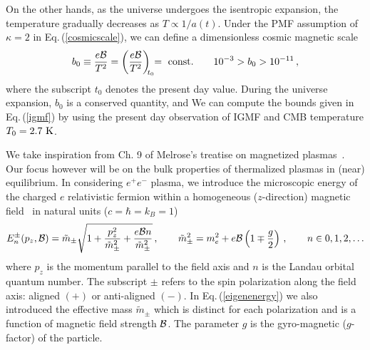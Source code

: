 \documentclass[a4paper]{article}
\newcommand{\req}[1]{Eq.\,(\ref{#1})}
\begin{document}


{\color{blue}On the other hands, as the universe undergoes the isentropic expansion,  the temperature gradually decreases as $T\propto1/a(t)$. Under the PMF assumption of $\kappa=2$ in \req{cosmicscale}, we can define a {\color{blue}dimensionless} cosmic magnetic scale
\begin{align}\label{magneticscale}
b_{0}\equiv\frac{e{\cal B}}{T^{2}}=\left(\frac{e{\cal B}}{T^{2}}\right)_{\!\!t_0}\!\!={\rm\ const.}\qquad10^{-3}>b_{0}>10^{-11}\,,
\end{align}
where the subscript $t_0$ denotes the present day value. During the universe expansion, $b_0$ is a conserved quantity, and We can compute the bounds given in \req{igmf} by using the present day observation of IGMF and CMB temperature $T_{0}=2.7{\rm\ K}$.}

We take inspiration from Ch. 9 of Melrose's treatise on magnetized plasmas~\cite{melrose2008quantum}. Our focus however will be on the bulk properties of thermalized plasmas in (near) equilibrium. In considering $e^{+}e^{-}$ plasma, we introduce the microscopic energy of the charged $e$ relativistic fermion within a homogeneous ($z$-direction) magnetic field~\cite{steinmetz2018magnetic} in natural units ($c=\hbar=k_{B}=1$)
\begin{align}
    \label{eigenenergy}
    E^{\pm}_{n}(p_{z},{\cal B})={\tilde m}_{\pm}\sqrt{1+\frac{p_{z}^{2}}{{\tilde m}_{\pm}^{2}}+\frac{e{\cal B}n}{{\tilde m}_{\pm}^{2}}}\,,\qquad {\tilde m}_{\pm}^{2}=m_{e}^{2}+e{\cal B}\left(1\mp\frac{g}{2}\right)\,,\qquad n\in0,1,2,\ldots
\end{align}
where $p_{z}$ is the momentum parallel to the field axis and $n$ is the Landau orbital quantum number. The subscript $\pm$ refers to the spin polarization along the field axis: aligned $(+)$ or anti-aligned $(-)$. In \req{eigenenergy} we also introduced the effective mass ${\tilde m}_{\pm}$ which is distinct for each polarization and is a function of magnetic field strength ${\cal B}$. The parameter $g$ is the gyro-magnetic ($g$-factor) of the particle.
\end{document}
